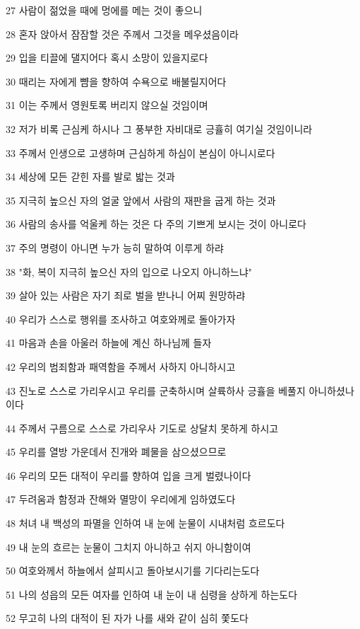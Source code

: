 \par 27 사람이 젊었을 때에 멍에를 메는 것이 좋으니
\par 28 혼자 앉아서 잠잠할 것은 주께서 그것을 메우셨음이라
\par 29 입을 티끌에 댈지어다 혹시 소망이 있을지로다
\par 30 때리는 자에게 뺨을 향하여 수욕으로 배불릴지어다
\par 31 이는 주께서 영원토록 버리지 않으실 것임이며
\par 32 저가 비록 근심케 하시나 그 풍부한 자비대로 긍휼히 여기실 것임이니라
\par 33 주께서 인생으로 고생하며 근심하게 하심이 본심이 아니시로다
\par 34 세상에 모든 갇힌 자를 발로 밟는 것과
\par 35 지극히 높으신 자의 얼굴 앞에서 사람의 재판을 굽게 하는 것과
\par 36 사람의 송사를 억울케 하는 것은 다 주의 기쁘게 보시는 것이 아니로다
\par 37 주의 명령이 아니면 누가 능히 말하여 이루게 하랴
\par 38 "화, 복이 지극히 높으신 자의 입으로 나오지 아니하느냐"
\par 39 살아 있는 사람은 자기 죄로 벌을 받나니 어찌 원망하랴
\par 40 우리가 스스로 행위를 조사하고 여호와께로 돌아가자
\par 41 마음과 손을 아울러 하늘에 계신 하나님께 들자
\par 42 우리의 범죄함과 패역함을 주께서 사하지 아니하시고
\par 43 진노로 스스로 가리우시고 우리를 군축하시며 살륙하사 긍휼을 베풀지 아니하셨나이다
\par 44 주께서 구름으로 스스로 가리우사 기도로 상달치 못하게 하시고
\par 45 우리를 열방 가운데서 진개와 폐물을 삼으셨으므로
\par 46 우리의 모든 대적이 우리를 향하여 입을 크게 벌렸나이다
\par 47 두려움과 함정과 잔해와 멸망이 우리에게 임하였도다
\par 48 처녀 내 백성의 파멸을 인하여 내 눈에 눈물이 시내처럼 흐르도다
\par 49 내 눈의 흐르는 눈물이 그치지 아니하고 쉬지 아니함이여
\par 50 여호와께서 하늘에서 살피시고 돌아보시기를 기다리는도다
\par 51 나의 성읍의 모든 여자를 인하여 내 눈이 내 심령을 상하게 하는도다
\par 52 무고히 나의 대적이 된 자가 나를 새와 같이 심히 쫓도다
